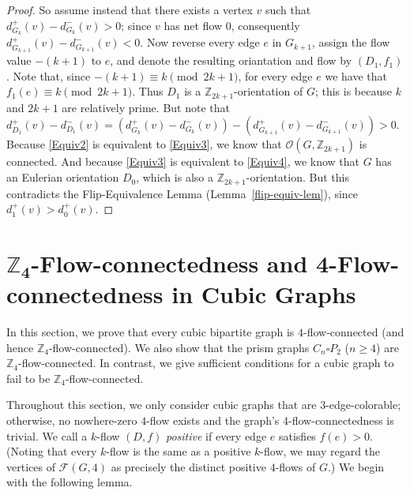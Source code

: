 \documentclass[a4paper,12pt]{article}
\theoremstyle{plain}
\theoremstyle{definition}
\newcommand{\Z}{\mathbb{Z}}
\newcommand\F{\mathcal{F}}
\renewcommand\O{\mathcal{O}}
\renewcommand\ge\geqslant
\begin{document}
\begin{proof}
So assume instead that there exists a vertex $v$ such that $d_{G_k}^+(v)-d_{G_k}^-(v) > 0$; since $v$ has net flow 0, consequently $d_{G_{k+1}}^+(v)-d_{G_{k+1}}^-(v) < 0$. Now reverse every edge $e$ in $G_{k+1}$, assign the flow value $-(k+1)$ to $e$, and denote the resulting oriantation and flow by $(D_1,f_1)$. Note that, since $-(k+1)\equiv k \pmod{2k+1}$, for every edge $e$ we have that $f_1(e)\equiv k\pmod{2k+1}$.
Thus $D_1$ is a $\Z_{2k+1}$-orientation of $G$; this is because $k$ and $2k+1$ are relatively prime. But note that $d_{D_1}^+(v)-d_{D_1}^-(v) = (d_{G_k}^+(v)-d_{G_k}^-(v)) - (d_{G_{k+1}}^+(v)-d_{G_{k+1}}^-(v)) > 0$. 
Because \ref{Equiv2} is equivalent to \ref{Equiv3}, we know that $\O(G,\Z_{2k+1})$ is connected. And because \ref{Equiv3} is equivalent to \ref{Equiv4}, we know that $G$ has an Eulerian orientation $D_0$, which is also a $\Z_{2k+1}$-orientation. But this contradicts the Flip-Equivalence Lemma (Lemma~\ref{flip-equiv-lem}), since $d^+_1(v)>d^+_0(v)$.
\end{proof}




\section{\texorpdfstring{$\bm{\Z_4}$}{Z4}-Flow-connectedness and \texorpdfstring{$\bm{4}$}{4}-Flow-connectedness in Cubic Graphs}
\label{Z4flow-sec}

In this section, we prove that every cubic bipartite graph is $4$-flow-connected (and hence $\Z_4$-flow-connected). We also show that the prism graphs $C_n\square P_2$ ($n\ge 4$) are $\Z_4$-flow-connected. In contrast, we give sufficient conditions for a cubic graph to fail to be $\Z_4$-flow-connected. 

Throughout this section, we only consider cubic graphs that are $3$-edge-colorable; otherwise, no nowhere-zero $4$-flow exists and the graph's $4$-flow-connectedness is trivial. We call a $k$-flow $(D,f)$ \emph{positive} if every edge $e$ satisfies $f(e)>0$. (Noting that every $k$-flow is the same as a positive $k$-flow, we may regard the vertices of $\F(G,4)$ as precisely the distinct positive $4$-flows of $G$.) We begin with the following lemma. 
\end{document}
